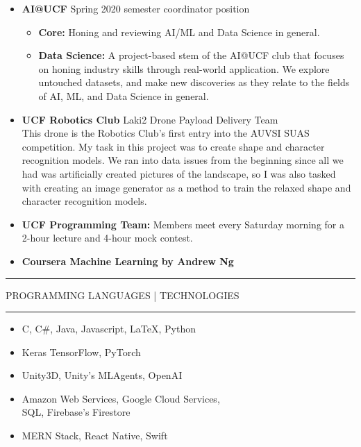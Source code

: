 \documentclass{article}
\newcommand{\makesection}[1]{\hrule\vskip1mm\uppercase{#1}\vskip1mm\hrule}
\begin{document}
    \begin{itemize}[leftmargin=.35cm]
        \item \textbf{AI@UCF} Spring 2020 semester coordinator position 
        \begin{itemize}[$\circ$]
            \item \textbf{Core:} Honing and reviewing AI/ML and Data Science in general.
            \item \textbf{Data Science:} A project-based stem of the AI@UCF club that focuses
            on honing industry skills through real-world application. We explore untouched
            datasets, and make new discoveries as they relate to the fields of AI, ML, and
            Data Science in general.
        \end{itemize}
        \item \textbf{UCF Robotics Club} Laki2 Drone Payload Delivery Team \\
        This drone is the Robotics Club's first entry into the AUVSI SUAS competition. My task
        in this project was to create shape and character recognition models. We ran into data
        issues from the beginning since all we had was artificially created pictures of the
        landscape, so I was also tasked with creating an image generator as a method to train
        the relaxed shape and character recognition models.
        \item \textbf{UCF Programming Team:} Members meet every Saturday morning for a 2-hour lecture
        and 4-hour mock contest.
        \item \textbf{Coursera Machine Learning by Andrew Ng}
    \end{itemize}
        
    \makesection{Programming Languages | Technologies}
    \vspace*{-2mm}
    \begin{multicols}{2}\begin{itemize}[leftmargin=.35cm]
        \setlength\itemsep{-.1cm}
        \item C, C\#, Java, Javascript, \LaTeX, Python
        \item Keras TensorFlow, PyTorch
        \item Unity3D, Unity's MLAgents, OpenAI
        \item Amazon Web Services, Google Cloud Services, \\
        SQL, Firebase's Firestore
        \item MERN Stack, React Native, Swift
    \end{itemize}\end{multicols}
\end{document}
